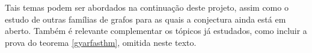 \documentclass{article}
\begin{document}
Tais temas podem ser abordados na continuação deste projeto, assim como o estudo de outras famílias de grafos para as quais a conjectura ainda está em aberto. Também é relevante complementar os tópicos já estudados, como incluir a prova do teorema \ref{gyarfasthm}, omitida neste texto.




\endgroup %
\end{document}
